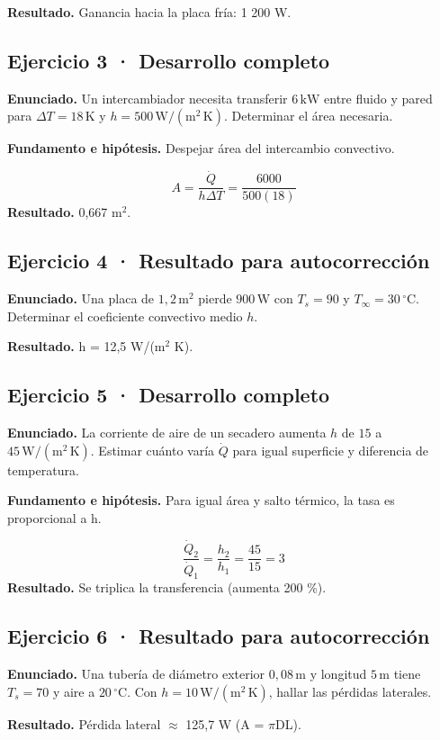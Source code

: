 \documentclass[11pt,a4paper]{article}
\begin{document}
\textbf{Resultado.} Ganancia hacia la placa fría: 1 200 W.


\subsection*{Ejercicio 3 · Desarrollo completo}
\textbf{Enunciado.} Un intercambiador necesita transferir \(6\,\mathrm{kW}\) entre fluido y pared para \(\Delta T=18\,\mathrm K\) y \(h=500\,\mathrm{W/(m^2\,K)}\). Determinar el área necesaria.

\textbf{Fundamento e hipótesis.} Despejar área del intercambio convectivo.

\[
A=\frac{\dot Q}{h\Delta T}=\frac{6000}{500(18)}
\]
\textbf{Resultado.} 0,667 m\ensuremath{^2}.


\subsection*{Ejercicio 4 · Resultado para autocorrección}
\textbf{Enunciado.} Una placa de \(1{,}2\,\mathrm m^2\) pierde \(900\,\mathrm W\) con \(T_s=90\) y \(T_\infty=30\,^\circ\mathrm C\). Determinar el coeficiente convectivo medio \(h\).

\textbf{Resultado.} h = 12,5 W/(m\ensuremath{^2} K).


\subsection*{Ejercicio 5 · Desarrollo completo}
\textbf{Enunciado.} La corriente de aire de un secadero aumenta \(h\) de \(15\) a \(45\,\mathrm{W/(m^2\,K)}\). Estimar cuánto varía \(\dot Q\) para igual superficie y diferencia de temperatura.

\textbf{Fundamento e hipótesis.} Para igual área y salto térmico, la tasa es proporcional a h.

\[
\frac{\dot Q_2}{\dot Q_1}=\frac{h_2}{h_1}=\frac{45}{15}=3
\]
\textbf{Resultado.} Se triplica la transferencia (aumenta 200 \%).


\subsection*{Ejercicio 6 · Resultado para autocorrección}
\textbf{Enunciado.} Una tubería de diámetro exterior \(0{,}08\,\mathrm m\) y longitud \(5\,\mathrm m\) tiene \(T_s=70\) y aire a \(20\,^\circ\mathrm C\). Con \(h=10\,\mathrm{W/(m^2\,K)}\), hallar las pérdidas laterales.

\textbf{Resultado.} Pérdida lateral \ensuremath{\approx} 125,7 W (A = \ensuremath{\pi}DL).
\end{document}
